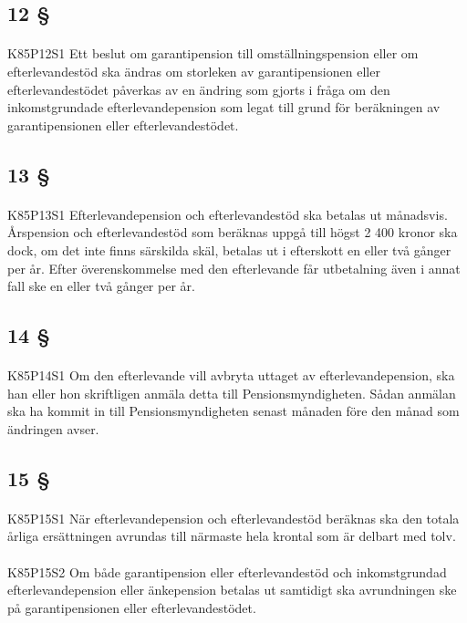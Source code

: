 \documentclass[a4paper,notitlepage,openany,10pt]{book}
\begin{document}
\subsection*{12 §}
\paragraph*{}
{\tiny K85P12S1}
Ett beslut om garantipension till omställningspension eller om efterlevandestöd ska ändras om storleken av garantipensionen eller efterlevandestödet påverkas av en ändring som gjorts i fråga om den inkomstgrundade efterlevandepension som legat till grund för beräkningen av garantipensionen eller efterlevandestödet.
\subsection*{13 §}
\paragraph*{}
{\tiny K85P13S1}
Efterlevandepension och efterlevandestöd ska betalas ut månadsvis. Årspension och efterlevandestöd som beräknas uppgå till högst 2 400 kronor ska dock, om det inte finns särskilda skäl, betalas ut i efterskott en eller två gånger per år.
Efter överenskommelse med den efterlevande får utbetalning även i annat fall ske en eller två gånger per år.
\subsection*{14 §}
\paragraph*{}
{\tiny K85P14S1}
Om den efterlevande vill avbryta uttaget av efterlevandepension, ska han eller hon skriftligen anmäla detta till Pensionsmyndigheten. Sådan anmälan ska ha kommit in till Pensionsmyndigheten senast månaden före den månad som ändringen avser.
\subsection*{15 §}
\paragraph*{}
{\tiny K85P15S1}
När efterlevandepension och efterlevandestöd beräknas ska den totala årliga ersättningen avrundas till närmaste hela krontal som är delbart med tolv.
\paragraph*{}
{\tiny K85P15S2}
Om både garantipension eller efterlevandestöd och inkomstgrundad efterlevandepension eller änkepension betalas ut samtidigt ska avrundningen ske på garantipensionen eller efterlevandestödet.
\end{document}
